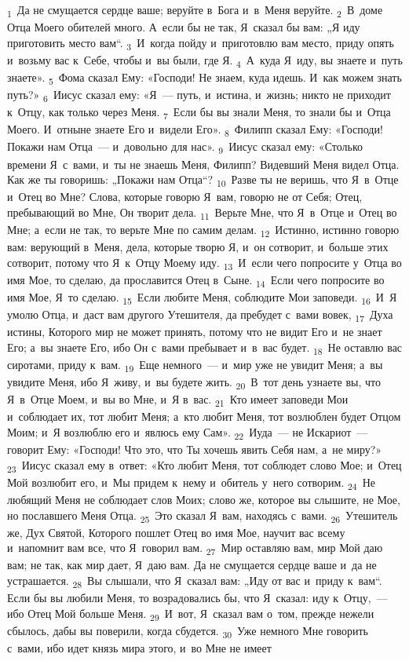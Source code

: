 \documentclass[a4paper,12pt]{article}
\begin{document}
\textsubscript{1}~Да не смущается сердце ваше; веруйте в~Бога и~в~Меня веруйте. \textsubscript{2}~В~доме Отца Моего обителей много. А~если бы не так, Я~сказал бы вам: „Я иду приготовить место вам“. \textsubscript{3}~И~когда пойду и~приготовлю вам место, приду опять и~возьму вас к~Себе, чтобы и~вы были, где Я. \textsubscript{4}~А~куда Я~иду, вы знаете и~путь знаете». \textsubscript{5}~Фома сказал Ему: «Господи! Не знаем, куда идешь. И~как можем знать путь?» \textsubscript{6}~Иисус сказал ему: «Я~--- путь, и~истина, и~жизнь; никто не приходит к~Отцу, как только через Меня. \textsubscript{7}~Если бы вы знали Меня, то знали бы и~Отца Моего. И~отныне знаете Его и~видели Его». \textsubscript{8}~Филипп сказал Ему: «Господи! Покажи нам Отца~--- и~довольно для нас». \textsubscript{9}~Иисус сказал ему: «Столько времени Я~с~вами, и~ты не знаешь Меня, Филипп? Видевший Меня видел Отца. Как же ты говоришь: „Покажи нам Отца“? \textsubscript{10}~Разве ты не веришь, что Я~в~Отце и~Отец во Мне? Слова, которые говорю Я~вам, говорю не от Себя; Отец, пребывающий во Мне, Он творит дела. \textsubscript{11}~Верьте Мне, что Я~в~Отце и~Отец во Мне; а~если не так, то верьте Мне по самим делам. \textsubscript{12}~Истинно, истинно говорю вам: верующий в~Меня, дела, которые творю Я, и~он сотворит, и~больше этих сотворит, потому что Я~к~Отцу Моему иду. \textsubscript{13}~И~если чего попросите у~Отца во имя Мое, то сделаю, да прославится Отец в~Сыне. \textsubscript{14}~Если чего попросите во имя Мое, Я~то сделаю. \textsubscript{15}~Если любите Меня, соблюдите Мои заповеди. \textsubscript{16}~И~Я умолю Отца, и~даст вам другого Утешителя, да пребудет с~вами вовек, \textsubscript{17}~Духа истины, Которого мир не может принять, потому что не видит Его и~не знает Его; а~вы знаете Его, ибо Он с~вами пребывает и~в~вас будет. \textsubscript{18}~Не оставлю вас сиротами, приду к~вам. \textsubscript{19}~Еще немного~--- и~мир уже не увидит Меня; а~вы увидите Меня, ибо Я~живу, и~вы будете жить. \textsubscript{20}~В~тот день узнаете вы, что Я~в~Отце Моем, и~вы во Мне, и~Я в~вас. \textsubscript{21}~Кто имеет заповеди Мои и~соблюдает их, тот любит Меня; а~кто любит Меня, тот возлюблен будет Отцом Моим; и~Я возлюблю его и~явлюсь ему Сам». \textsubscript{22}~Иуда~--- не Искариот~--- говорит Ему: «Господи! Что это, что Ты хочешь явить Себя нам, а~не миру?» \textsubscript{23}~Иисус сказал ему в~ответ: «Кто любит Меня, тот соблюдет слово Мое; и~Отец Мой возлюбит его, и~Мы придем к~нему и~обитель у~него сотворим. \textsubscript{24}~Не любящий Меня не соблюдает слов Моих; слово же, которое вы слышите, не Мое, но пославшего Меня Отца. \textsubscript{25}~Это сказал Я~вам, находясь с~вами. \textsubscript{26}~Утешитель же, Дух Святой, Которого пошлет Отец во имя Мое, научит вас всему и~напомнит вам все, что Я~говорил вам. \textsubscript{27}~Мир оставляю вам, мир Мой даю вам; не так, как мир дает, Я~даю вам. Да не смущается сердце ваше и~да не устрашается. \textsubscript{28}~Вы слышали, что Я~сказал вам: „Иду от вас и~приду к~вам“. Если бы вы любили Меня, то возрадовались бы, что Я~сказал: иду к~Отцу,~--- ибо Отец Мой больше Меня. \textsubscript{29}~И~вот, Я~сказал вам о~том, прежде нежели сбылось, дабы вы поверили, когда сбудется. \textsubscript{30}~Уже немного Мне говорить с~вами, ибо идет князь мира этого, и~во Мне не имеет 
\end{document}
